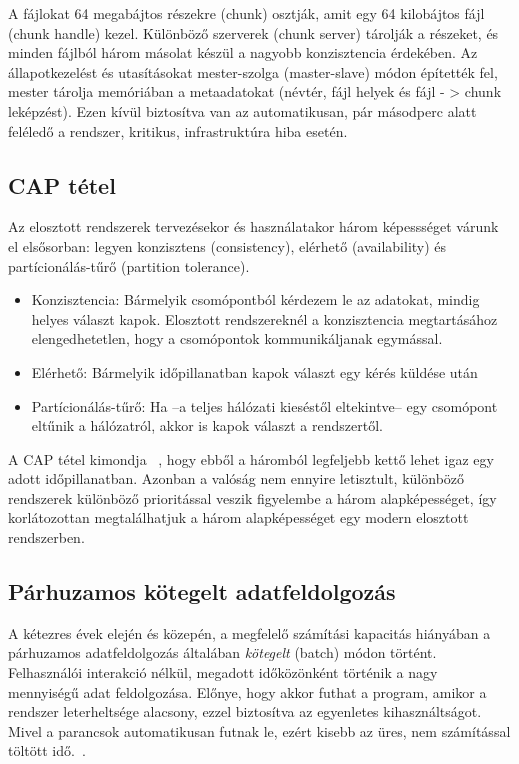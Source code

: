 \documentclass[a4paper,12pt]{article}
\begin{document}
A fájlokat 64 megabájtos részekre (chunk) osztják, amit egy 64 kilobájtos fájl (chunk handle) kezel. Különböző szerverek (chunk server) tárolják a részeket, és minden fájlból három másolat készül a nagyobb konzisztencia érdekében. Az állapotkezelést és utasításokat mester-szolga (master-slave) módon építették fel, mester tárolja memóriában a metaadatokat (névtér, fájl helyek és fájl - > chunk leképzést). Ezen kívül biztosítva van az automatikusan, pár másodperc alatt feléledő a rendszer, kritikus, infrastruktúra hiba esetén.

\subsection{CAP tétel}
Az elosztott rendszerek tervezésekor és használatakor három képessséget várunk el elsősorban: legyen konzisztens (consistency), elérhető (availability) és partícionálás-tűrő (partition tolerance). 
\begin{itemize}
\item Konzisztencia: Bármelyik csomópontból kérdezem le az adatokat, mindig helyes választ kapok. Elosztott rendszereknél a konzisztencia megtartásához elengedhetetlen, hogy a csomópontok kommunikáljanak egymással. 
\item Elérhető: Bármelyik időpillanatban kapok választ egy kérés küldése után
\item Partícionálás-tűrő: Ha --a teljes hálózati kieséstől eltekintve-- egy csomópont eltűnik a hálózatról, akkor is kapok választ a rendszertől.
\end{itemize}
A CAP tétel kimondja ~\cite{cap}, hogy ebből a háromból legfeljebb kettő lehet igaz egy adott időpillanatban. Azonban a valóság nem ennyire letisztult, különböző rendszerek különböző prioritással veszik figyelembe a három alapképességet, így korlátozottan megtalálhatjuk a három alapképességet egy modern elosztott rendszerben. ~\cite{ecap}

\subsection{Párhuzamos kötegelt adatfeldolgozás}
A kétezres évek elején és közepén, a megfelelő számítási kapacitás hiányában a párhuzamos adatfeldolgozás általában \textsl{kötegelt} (batch) módon történt. Felhasználói interakció nélkül, megadott időközönként történik a nagy mennyiségű adat feldolgozása. Előnye, hogy akkor futhat a program, amikor a rendszer leterheltsége alacsony, ezzel biztosítva az egyenletes kihasználtságot. Mivel a parancsok automatikusan futnak le, ezért kisebb az üres, nem számítással töltött idő.~\cite{batch}.
\end{document}
